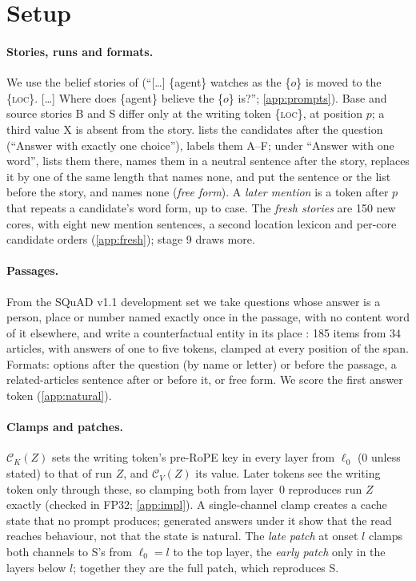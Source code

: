 \section{Setup}\label{sec:method}

\paragraph{Stories, runs and formats.}
We use the belief stories of \citet{anonymous2026fitted} (``[\dots] \{agent\} watches as the \{$o$\} is moved to the \{\textsc{loc}\}. [\dots] Where does \{agent\} believe the \{$o$\} is?''; \cref{app:prompts}). Base and source stories B and S differ only at the writing token \{\textsc{loc}\}, at position $p$; a third value X is absent from the story. \fmtOpt{} lists the candidates after the question (``Answer with exactly one choice''), \fmtLetter{} labels them A--F; under ``Answer with one word'', \fmtListA{} lists them there, \fmtPost{} names them in a neutral sentence after the story, \fmtNull{} replaces it by one of the same length that names none, \fmtSentB{} and \fmtBefore{} put the sentence or the list before the story, and \fmtNone{} names none (\emph{free form}). A \emph{later mention} is a token after $p$ that repeats a candidate's word form, up to case. The \emph{fresh stories} are 150 new cores, with eight new mention sentences, a second location lexicon and per-core candidate orders (\cref{app:fresh}); stage 9 draws \NqStories{} more.

\paragraph{Passages.}
From the SQuAD v1.1 development set \citep{rajpurkar2016squad} we take questions whose answer is a person, place or number named exactly once in the passage, with no content word of it elsewhere, and write a counterfactual entity in its place \citep{longpre2021conflicts}: 185 items from 34 articles, with answers of one to five tokens, clamped at every position of the span. Formats: options after the question (by name or letter) or before the passage, a related-articles sentence after or before it, or free form. We score the first answer token (\cref{app:natural}).

\paragraph{Clamps and patches.}
$\mathcal{C}_K(Z)$ sets the writing token's pre-RoPE key in every layer from $\ell_0$ ($0$ unless stated) to that of run $Z$, and $\mathcal{C}_V(Z)$ its value. Later tokens see the writing token only through these, so clamping both from layer~0 reproduces run $Z$ exactly (checked in FP32; \cref{app:impl}). A single-channel clamp creates a cache state that no prompt produces; generated answers under it show that the read reaches behaviour, not that the state is natural. The \emph{late patch} at onset $l$ clamps both channels to S's from $\ell_0 = l$ to the top layer, the \emph{early patch} only in the layers below $l$; together they are the full patch, which reproduces S.

